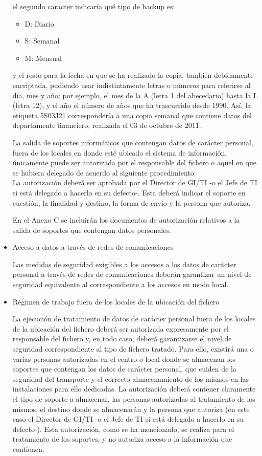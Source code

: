 \documentclass[a4paper,11pt,bibtotoc,noliststotoc]{scrbook}
\begin{document}
\begin{itemize}
el segundo caracter indicaría qué tipo de backup es:

\begin{itemize}
\item D: Diario
\item S: Semanal
\item M: Mensual
\end{itemize}

y el resto para la fecha en que se ha realizado la copia, también debidamente encriptada, pudiendo usar indistintamente letras o números para referirse al día, mes y año; por ejemplo, el mes de la A (letra 1 del abecedario) hasta la L (letra 12), y el año el número de años que ha trascurrido desde 1990. Así, la etiqueta 5S03J21 correspondería a una copia semanal que contiene datos del departamente financiero, realizada el 03 de octubre de 2011.

La salida de soportes informáticos que contengan datos de carácter personal, fuera de los locales en donde esté ubicado el sistema de información, únicamente puede ser autorizada por el responsable del fichero o aquel en que se hubiera delegado de acuerdo al siguiente procedimiento: \\
La autorización deberá ser aprobada por el Director de GI/TI -o el Jefe de TI si está delegado a hacerlo en su defecto-. Esta deberá indicar el soporte en cuestión, la finalidad y destino, la forma de envío y la persona que autoriza.

En el Anexo C se incluirán los documentos de autorización relativos a la salida de soportes que contengan datos personales.


\item Acceso a datos a través de redes de comunicaciones

Las medidas de seguridad exigibles a los accesos a los datos de carácter personal a través de redes de comunicaciones deberán garantizar un nivel de seguridad equivalente al correspondiente a los accesos en modo local.


\item Régimen de trabajo fuera de los locales de la ubicación del fichero

La ejecución de tratamiento de datos de carácter personal fuera de los locales de la ubicación del fichero deberá ser autorizada expresamente por el responsable del fichero y, en todo caso, deberá garantizarse el nivel de seguridad correspondiente al tipo de fichero tratado. Para ello, existirá una o varias personas autorizadas en el centro o local donde se almacenan los soportes que contengan los datos de carácter personal, que cuiden de la seguridad del transporte y el correcto almacenamiento de los mismos en las instalaciones para ello dedicadas. La autorización deberá contener claramente el tipo de soporte a almacenar, las personas autorizadas al tratamiento de los mismos, el destino donde se almacenarán y la persona que autoriza (en este caso el Director de GI/TI -o el Jefe de TI si está delegado a hacerlo en su defecto-). Esta autorización, como se ha mencionado, se realiza para el tratamiento de los soportes, y no autoriza acceso a la información que contienen.



\end{itemize}
\end{document}
